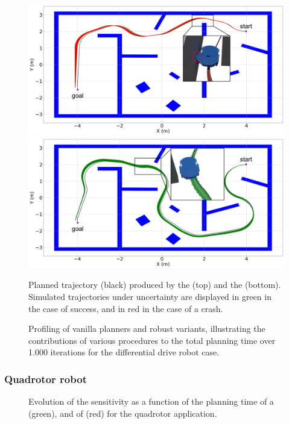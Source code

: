 \begin{figure} [ht]
    \centering
    \includegraphics[width=0.9\linewidth]{figures/samp/non_robust_unic.png}
    \includegraphics[width=0.9\linewidth]{figures/samp/robust_unic.png}
    \caption{Planned trajectory (black) produced by the  (top) and the  (bottom). 
    Simulated trajectories under uncertainty are displayed in green in the case of success, and in red in the case of a crash.}%
    \label{fig:robust_unic}%
\end{figure}

\begin{figure} [ht]
    \centering
     
    \caption{Profiling of vanilla planners and robust  variants, illustrating the contributions of various procedures to the total planning time over 1.000 iterations for the differential drive robot case.}%
    \label{fig:profiling_unic}%
\end{figure}

\subsubsection{Quadrotor robot}

\begin{figure} [htp]
    \centering
     
    \caption{Evolution of the sensitivity as a function of the planning time of a  (green), and of  (red) for the quadrotor application.}%
    \label{fig:samp_quad_time}%
\end{figure}

